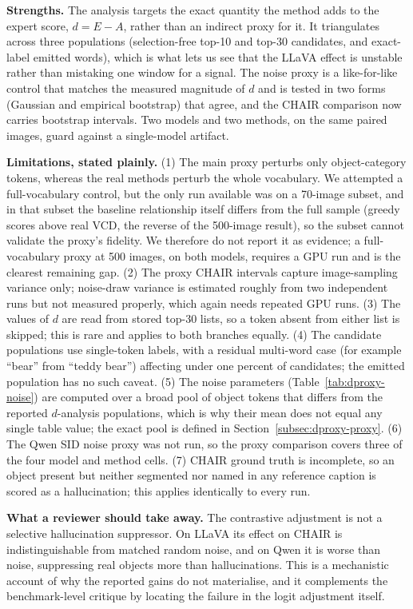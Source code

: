 \documentclass{article}
\begin{document}
\textbf{Strengths.} The analysis targets the exact quantity the method adds to the
expert score, $d = E - A$, rather than an indirect proxy for it. It triangulates
across three populations (selection-free top-10 and top-30 candidates, and
exact-label emitted words), which is what lets us see that the LLaVA effect is
unstable rather than mistaking one window for a signal. The noise proxy is a
like-for-like control that matches the measured magnitude of $d$ and is tested in
two forms (Gaussian and empirical bootstrap) that agree, and the CHAIR comparison
now carries bootstrap intervals. Two models and two methods, on the same paired
images, guard against a single-model artifact.

\textbf{Limitations, stated plainly.} (1) The main proxy perturbs only
object-category tokens, whereas the real methods perturb the whole vocabulary. We
attempted a full-vocabulary control, but the only run available was on a 70-image
subset, and in that subset the baseline relationship itself differs from the full
sample (greedy scores above real VCD, the reverse of the 500-image result), so
the subset cannot validate the proxy's fidelity. We therefore do not report it as
evidence; a full-vocabulary proxy at 500 images, on both models, requires a GPU
run and is the clearest remaining gap. (2) The proxy CHAIR intervals capture
image-sampling variance only; noise-draw variance is estimated roughly from two
independent runs but not measured properly, which again needs repeated GPU runs.
(3) The values of $d$ are read from stored top-30 lists, so a token absent from
either list is skipped; this is rare and applies to both branches equally. (4)
The candidate populations use single-token labels, with a residual multi-word
case (for example ``bear'' from ``teddy bear'') affecting under one percent of
candidates; the emitted population has no such caveat. (5) The noise parameters
(Table~\ref{tab:dproxy-noise}) are computed over a broad pool of object tokens
that differs from the reported $d$-analysis populations, which is why their mean
does not equal any single table value; the exact pool is defined in
Section~\ref{subsec:dproxy-proxy}. (6) The Qwen SID noise proxy was not run, so
the proxy comparison covers three of the four model and method cells. (7) CHAIR
ground truth is incomplete, so an object present but neither segmented nor named
in any reference caption is scored as a hallucination; this applies identically
to every run.

\textbf{What a reviewer should take away.} The contrastive adjustment is not a
selective hallucination suppressor. On LLaVA its effect on CHAIR is
indistinguishable from matched random noise, and on Qwen it is worse than noise,
suppressing real objects more than hallucinations. This is a mechanistic account
of why the reported gains do not materialise, and it complements the
benchmark-level critique by locating the failure in the logit adjustment itself.




\end{document}
